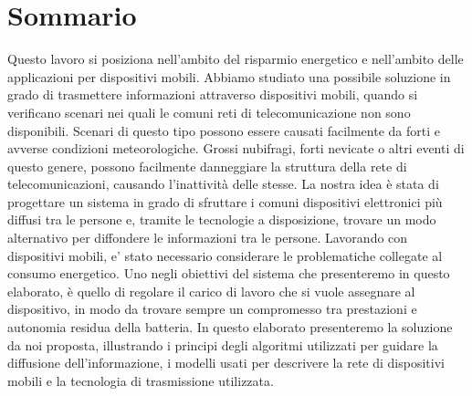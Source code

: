 
\begingroup
\let\clearpage\relax
\let\cleardoublepage\relax
\let\cleardoublepage\relax

\chapter*{Sommario}
Questo lavoro si posiziona nell'ambito del risparmio energetico e nell'ambito delle applicazioni per dispositivi mobili. Abbiamo studiato una possibile soluzione in grado di trasmettere informazioni attraverso dispositivi mobili, quando si verificano scenari nei quali le comuni reti di telecomunicazione non sono disponibili. Scenari di questo tipo possono essere causati facilmente da forti e avverse condizioni meteorologiche. Grossi nubifragi, forti nevicate o altri eventi di questo genere, possono facilmente danneggiare la struttura della rete di telecomunicazioni, causando l'inattività delle stesse. La nostra idea è stata di progettare un sistema in grado di sfruttare i comuni dispositivi elettronici più diffusi tra le persone e, tramite le tecnologie a disposizione, trovare un modo alternativo per diffondere le informazioni tra le persone. Lavorando con dispositivi mobili, e' stato necessario considerare le problematiche collegate al consumo energetico. Uno negli obiettivi del sistema che presenteremo in questo elaborato, è quello di regolare il carico di lavoro che si vuole assegnare al dispositivo, in modo da trovare sempre un compromesso tra prestazioni e autonomia residua della batteria.
In questo elaborato presenteremo la soluzione da noi proposta, illustrando i principi degli algoritmi utilizzati per guidare la diffusione dell'informazione, i modelli usati per descrivere la rete di dispositivi mobili e la tecnologia di trasmissione utilizzata.
\endgroup